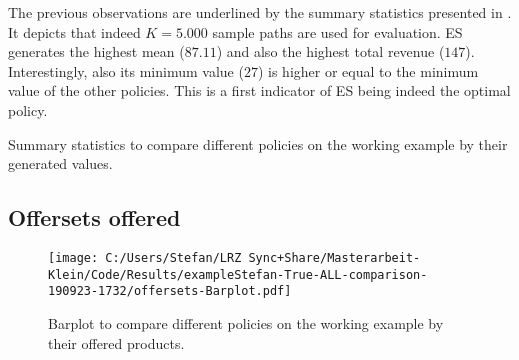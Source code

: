 The previous observations are underlined by the summary statistics presented in . It depicts that indeed $K=5.000$ sample paths are used for evaluation. ES generates the highest mean ($87.11$) and also the highest total revenue ($147$). Interestingly, also its minimum value ($27$) is higher or equal to the minimum value of the other policies. This is a first indicator of ES being indeed the optimal policy.

\begin{table}
	\centering
	
	\caption[Summary statistics for comparison of working example - values.]{\label{tb-comp-work-val}Summary statistics to compare different policies on the working example by their generated values.}
\end{table}

\subsection{Offersets offered}



\begin{figure}[!ht]
%
%		
	\begin{minipage}[t][7cm][t]{.6\textwidth}
		\centering
		\texttt{[image: C:/Users/Stefan/LRZ Sync+Share/Masterarbeit-Klein/Code/Results/exampleStefan-True-ALL-comparison-190923-1732/offersets-Barplot.pdf]}
	\end{minipage}%
	\quad
	\begin{minipage}[b][7cm][t]{.5\textwidth}
		\vspace*{1cm}
		\scriptsize
		
	\end{minipage}%
	\caption[Barplot for comparison of working example - offersets.]{\label{fig-comp-work-off}Barplot to compare different policies on the working example by their offered products.}
\end{figure}

